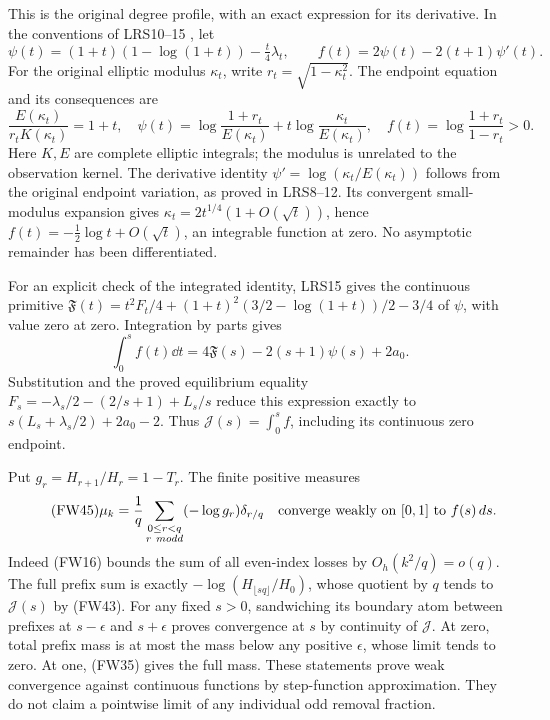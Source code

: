 \documentclass[11pt]{article}
\begin{document}
This is the original degree profile, with an exact expression for its
derivative. In the conventions of LRS10--15 \cite{lrs}, let
\[
 \psi(t)=(1+t)(1-\log(1+t))-\tfrac t4\lambda_t,\qquad
 f(t)=2\psi(t)-2(t+1)\psi'(t).
\]
For the original elliptic modulus $\kappa_t$, write
$r_t=\sqrt{1-\kappa_t^2}$. The endpoint equation and its consequences are
\begin{equation}\tag{FW44}
 \frac{E(\kappa_t)}{r_tK(\kappa_t)}=1+t,\quad
 \psi(t)=\log\frac{1+r_t}{E(\kappa_t)}
                 +t\log\frac{\kappa_t}{E(\kappa_t)},\quad
 f(t)=\log\frac{1+r_t}{1-r_t}>0.
\end{equation}
Here $K,E$ are complete elliptic integrals; the modulus is unrelated to
the observation kernel. The derivative identity
$\psi'=\log(\kappa_t/E(\kappa_t))$ follows from the original endpoint
variation, as proved in LRS8--12. Its convergent small-modulus expansion
gives $\kappa_t=2t^{1/4}(1+O(\sqrt t))$, hence
$f(t)=-\tfrac12\log t+O(\sqrt t)$, an integrable function at zero.
No asymptotic remainder has been differentiated.

For an explicit check of the integrated identity, LRS15 gives the
continuous primitive
$\mathfrak F(t)=t^2F_t/4+(1+t)^2(3/2-\log(1+t))/2-3/4$
of $\psi$, with value zero at zero. Integration by parts gives
\[
 \int_0^s f(t)\dd t=4\mathfrak F(s)-2(s+1)\psi(s)+2a_0.
\]
Substitution and the proved equilibrium equality
$F_s=-\lambda_s/2-(2/s+1)+L_s/s$ reduce this expression exactly to
$s(L_s+\lambda_s/2)+2a_0-2$. Thus $\mathcal J(s)=\int_0^s f$,
including its continuous zero endpoint.

Put $g_r=H_{r+1}/H_r=1-T_r$. The finite positive measures
\begin{equation}\tag{FW45}
 \mu_k=\frac1q\sum_{\substack{0\le r<q\\r\ {
m odd}}}
              (-\log g_r)\delta_{r/q}
 \quad\hbox{converge weakly on $[0,1]$ to }f(s)\,d s.
\end{equation}
Indeed (FW16) bounds the sum of all even-index losses by
$O_h(k^2/q)=o(q)$. The full prefix sum is exactly
$-\log(H_{\lfloor sq\rfloor}/H_0)$, whose quotient by $q$ tends to
$\mathcal J(s)$ by (FW43). For any fixed $s>0$, sandwiching its boundary
atom between prefixes at $s-\epsilon$ and $s+\epsilon$ proves convergence
at $s$ by continuity of $\mathcal J$. At zero, total prefix mass is at
most the mass below any positive $\epsilon$, whose limit tends to zero.
At one, (FW35) gives the full mass. These statements prove weak convergence
against continuous functions by step-function approximation. They do not
claim a pointwise limit of any individual odd removal fraction.
\end{document}
